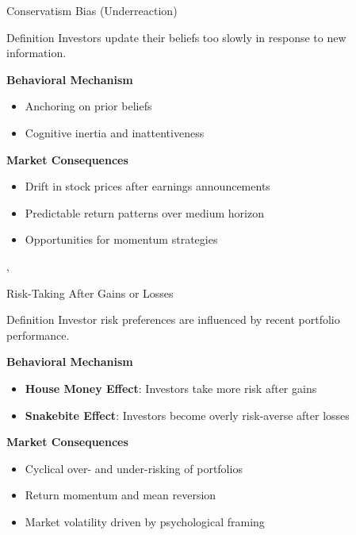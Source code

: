 \begin{frame}{Conservatism Bias (Underreaction)}
	\begin{block}{Definition}  
		Investors update their beliefs too slowly in response to new information.
	\end{block}
	
	\vspace{0.3cm}
	\textbf{Behavioral Mechanism}
	\begin{itemize}
		\item Anchoring on prior beliefs
		\item Cognitive inertia and inattentiveness
	\end{itemize}
	
	\vspace{0.3cm}
	\textbf{Market Consequences}
	\begin{itemize}
		\item Drift in stock prices after earnings announcements
		\item Predictable return patterns over medium horizon
		\item Opportunities for momentum strategies
	\end{itemize}
	
	\vspace{0.2cm}
	\tiny{\textcite{barberis1998model}, \textcite{hong1999underreaction}}
\end{frame}

\begin{frame}{Risk-Taking After Gains or Losses}
	\begin{block}{Definition}  
		Investor risk preferences are influenced by recent portfolio performance.
	\end{block}
	
	\vspace{0.3cm}
	\textbf{Behavioral Mechanism}
	\begin{itemize}
		\item \textbf{House Money Effect}: Investors take more risk after gains
		\item \textbf{Snakebite Effect}: Investors become overly risk-averse after losses
	\end{itemize}
	
	\vspace{0.3cm}
	\textbf{Market Consequences}
	\begin{itemize}
		\item Cyclical over- and under-risking of portfolios
		\item Return momentum and mean reversion
		\item Market volatility driven by psychological framing
	\end{itemize}
	
	\vspace{0.2cm}
	\tiny{\textcite{thaler1990mental}}
\end{frame}

